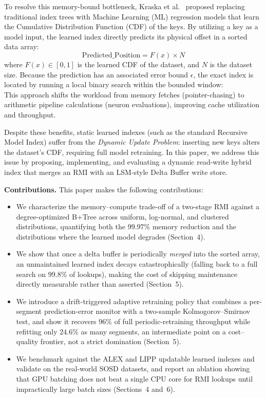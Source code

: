 \documentclass[sigconf,nonacm]{acmart}
\begin{document}
To resolve this memory-bound bottleneck, Kraska et al.~\cite{kraska2018case} proposed replacing traditional index trees with Machine Learning (ML) regression models that learn the Cumulative Distribution Function (CDF) of the keys. By utilizing a key as a model input, the learned index directly predicts its physical offset in a sorted data array:
\begin{equation}
    \text{Predicted\_Position} = F(x) \times N
\end{equation}
where $F(x) \in [0,1]$ is the learned CDF of the dataset, and $N$ is the dataset size. Because the prediction has an associated error bound $\epsilon$, the exact index is located by running a local binary search within the bounded window:
\begin{equation}
    [\text{Predicted\_Position} - \epsilon, \text{Predicted\_Position} + \epsilon]
\end{equation}
This approach shifts the workload from memory fetches (pointer-chasing) to arithmetic pipeline calculations (neuron evaluations), improving cache utilization and throughput. 

Despite these benefits, static learned indexes (such as the standard Recursive Model Index) suffer from the \textit{Dynamic Update Problem}: inserting new keys alters the dataset's CDF, requiring full model retraining. In this paper, we address this issue by proposing, implementing, and evaluating a dynamic read-write hybrid index that merges an RMI with an LSM-style Delta Buffer write store.

\medskip
\noindent\textbf{Contributions.} This paper makes the following contributions:
\begin{itemize}
    \item We characterize the memory--compute trade-off of a two-stage RMI against a degree-optimized B+Tree across uniform, log-normal, and clustered distributions, quantifying both the $99.97\%$ memory reduction and the distributions where the learned model degrades (Section~4).
    \item We show that once a delta buffer is periodically \emph{merged} into the sorted array, an unmaintained learned index decays catastrophically (falling back to a full search on $99.8\%$ of lookups), making the cost of skipping maintenance directly measurable rather than asserted (Section~5).
    \item We introduce a drift-triggered adaptive retraining policy that combines a per-segment prediction-error monitor with a two-sample Kolmogorov--Smirnov test, and show it recovers $96\%$ of full periodic-retraining throughput while refitting only $24.6\%$ as many segments, an intermediate point on a cost--quality frontier, not a strict domination (Section~5).
    \item We benchmark against the ALEX and LIPP updatable learned indexes and validate on the real-world SOSD datasets, and report an ablation showing that GPU batching does not beat a single CPU core for RMI lookups until impractically large batch sizes (Sections~4 and~6).
\end{itemize}
\end{document}
